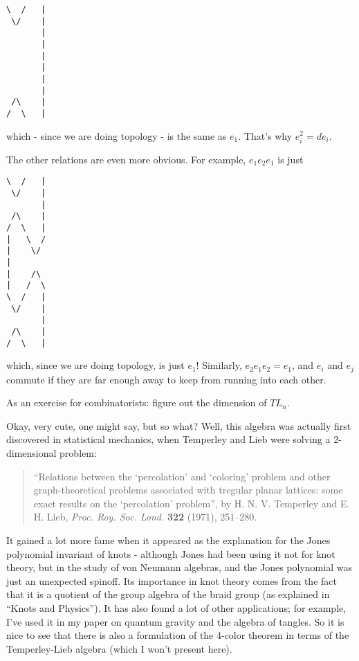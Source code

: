 \documentclass{article}
\begin{document}
\begin{verbatim}
\  /   |
 \/    |
       |
       |
       |
       |
       |
       |
 /\    |
/  \   |
\end{verbatim}

which - since we are doing topology - is the same as \(e_1\). That's why
\(e_i^2 = de_i\).

The other relations are even more obvious. For example, \(e_1 e_2 e_1\)
is just

\begin{verbatim}
\  /   |
 \/    |
       |
 /\    |
/  \   |
|   \  /  
|    \/   
|      
|    /\   
|   /  \  
\  /   |
 \/    |
       |
 /\    |
/  \   |
\end{verbatim}

which, since we are doing topology, is just \(e_1\)! Similarly,
\(e_2 e_1 e_2 = e_1\), and \(e_i\) and \(e_j\) commute if they are far
enough away to keep from running into each other.

As an exercise for combinatorists: figure out the dimension of \(TL_n\).

Okay, very cute, one might say, but so what? Well, this algebra was
actually first discovered in statistical mechanics, when Temperley and
Lieb were solving a 2-dimensional problem:

\begin{quote}
``Relations between the `percolation' and `coloring' problem and other
graph-theoretical problems associated with tregular planar lattices:
some exact results on the `percolation' problem'', by H. N. V. Temperley
and E. H. Lieb, \emph{Proc. Roy. Soc. Lond.} \textbf{322} (1971),
251--280.
\end{quote}

It gained a lot more fame when it appeared as the explanation for the
Jones polynomial invariant of knots - although Jones had been using it
not for knot theory, but in the study of von Neumann algebras, and the
Jones polynomial was just an unexpected spinoff. Its importance in knot
theory comes from the fact that it is a quotient of the group algebra of
the braid group (as explained in ``Knots and Physics''). It has also
found a lot of other applications; for example, I've used it in my paper
on quantum gravity and the algebra of tangles. So it is nice to see that
there is also a formulation of the 4-color theorem in terms of the
Temperley-Lieb algebra (which I won't present here).
\end{document}
